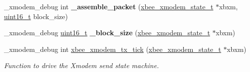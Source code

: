 \begin{DoxyCompactItemize}
\mbox{\label{group__util__xmodem_ga96fca6132d78345b4a3c20f89971aede}} 
\+\_\+xmodem\+\_\+debug int {\bfseries \+\_\+assemble\+\_\+packet} (\hyperlink{structxbee__xmodem__state__t}{xbee\+\_\+xmodem\+\_\+state\+\_\+t} $\ast$xbxm, \hyperlink{group__hal__dos_ga5a8b2dc9e45a9ee81a94ef304fb62505}{uint16\+\_\+t} block\+\_\+size)
\item 
\mbox{\label{group__util__xmodem_gab3bb5db3c60870f771cae1268fa24eb4}} 
\+\_\+xmodem\+\_\+debug \hyperlink{group__hal__dos_ga5a8b2dc9e45a9ee81a94ef304fb62505}{uint16\+\_\+t} {\bfseries \+\_\+block\+\_\+size} (\hyperlink{structxbee__xmodem__state__t}{xbee\+\_\+xmodem\+\_\+state\+\_\+t} $\ast$xbxm)
\item 
\+\_\+xmodem\+\_\+debug int \hyperlink{group__util__xmodem_ga1de6d8cc3628767d877e854f92ab2b0e}{xbee\+\_\+xmodem\+\_\+tx\+\_\+tick} (\hyperlink{structxbee__xmodem__state__t}{xbee\+\_\+xmodem\+\_\+state\+\_\+t} $\ast$xbxm)
\begin{DoxyCompactList}\small\item\em Function to drive the Xmodem send state machine. \end{DoxyCompactList}\end{DoxyCompactItemize}
